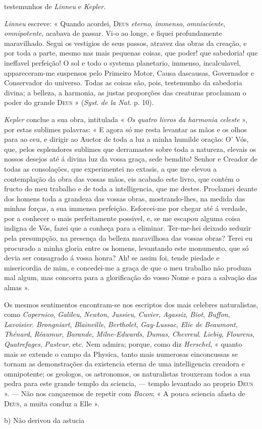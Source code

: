 testemunhos de \emph{Linneu} e \emph{Kepler}.\par \emph{Linneu} escreve: « Quando acordei, \textsc{Deus} \emph{eterno}, \emph{immenso}, \emph{omnisciente}, \emph{omnipotente}, acabava de passar. Vi-o ao longe, e fiquei profundamente maravilhado. Segui os vestigios de seus passos, atravez das obras da creação, e por toda a parte, mesmo nas mais pequenas coisas, que poder! que sabedoria! que ineffavel perfeição! O sol e todo o systema planetario, immenso, incalculavel, appareceram-me suspensos pelo Primeiro Motor, Causa dascausas, Governador e Conservador do universo. Todas as coisas são, pois, testemunho da sabedoria divina; a belleza, a harmonia, as justas proporções das creaturas proclamam o poder do grande \textsc{Deus} » (\emph{Syst}. \emph{de la Nat}. p. 10).\par \emph{Kepler} conclue a sua obra, intitulada « \emph{Os quatro livros da harmonia celeste} », por estas sublimes palavras: « E agora só me resta levantar as mãos e os olhos para ao ceu, e dirigir ao Auctor de toda a luz a minha humilde oração: O' Vós, que, pelos esplendores sublimes que derramastes sobre toda a natureza, elevais os nossos desejos até á divina luz da vossa graça, sede bemdito! Senhor e Creador de todas as consolações, que experimentei no extasis, a que me elevou a contemplação da obra das vossas mãos, eis acabado este livro, que contém o fructo do meu trabalho e de toda a intelligencia, que me destes. Proclamei deante dos homens toda a grandeza das vossas obras, mostrando-lhes, na medida das minhas forças, a sua immensa perfeição. Esforcei-me por chegar até á verdade, por a conhecer o mais perfeitamente possivel, e, se me escapou alguma coisa indigna de Vós, fazei que a conheça para a eliminar. Ter-me-hei deixado seduzir pela presumpção, na presença da belleza maravilhosa das vossas obras? Terei eu procurado a minha gloria entre os homens, levantando este monumento, que só devia ser consagrado á vossa honra? Ah! se assim foi, tende piedade e misericordia de mim, e concedei-me a graça de que o meu trabalho não produza mal algum, mas concorra para a glorificação do vosso Nome e para a salvação das almas ».\par Os mesmos sentimentos encontram-se nos escriptos dos mais celebres naturalistas, como \emph{Copernico}, \emph{Galileu}, \emph{Newton}, \emph{Jussieu}, \emph{Cuvier}, \emph{Agassiz}, \emph{Biot}, \emph{Buffon}, \emph{Lavoisier}. \emph{Brongniart}, \emph{Blainville}, \emph{Bertholet}, \emph{Gay-Lussac}, \emph{Elie de Beaumont}, \emph{Thénard}, \emph{Réaumur}, \emph{Barande}, \emph{Milne-Edwards}, \emph{Dumas}, \emph{Chevreul}. \emph{Liebig}, \emph{Flourens}, \emph{Quatrefages}, \emph{Pasteur}, etc. Nem admira; porque, como diz \emph{Herschel}, « quanto mais se extende o campo da Physica, tanto mais numerosas einconcussas se tornam as demonstrações da existencia eterna de uma intelligencia creadora e omnipotente; os geologos, os astronomos, os naturalistas trouxeram todos a sua pedra para este grande templo da sciencia, --- templo levantado ao proprio \textsc{Deus} ». --- Não nos cançaremos de repetir com \emph{Bacon}; « A pouca sciencia afasta de \textsc{Deus}, a muita conduz a Elle ».\par b) Não derivou da astucia 